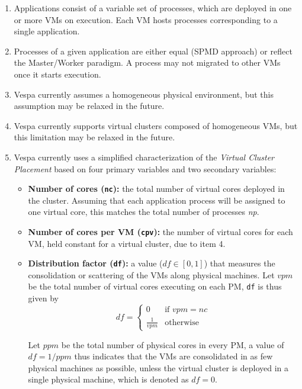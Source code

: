 \documentclass[11pt]{article}
\begin{document}
\begin{enumerate}
  \item Applications consist of a variable set of processes, which are deployed in one or more VMs on execution. Each VM hosts processes corresponding to a single application.
  \item Processes of a given application are either equal (SPMD approach) or reflect the Master/Worker paradigm. A process may not migrated to other VMs once it starts execution.%
  \item Vespa currently assumes a homogeneous physical environment, but this assumption may be relaxed in the future.
  \item Vespa currently supports virtual clusters composed of homogeneous VMs, but this limitation may be relaxed in the future.
  \item Vespa currently uses a simplified characterization of the \emph{Virtual Cluster Placement} based on four primary variables and two secondary variables:
  \begin{itemize}
    \item \textbf{Number of cores (\texttt{nc}):} the total number of virtual cores deployed in the cluster. Assuming that each application process will be assigned to one virtual core, this matches the total number of processes \textit{np}.
  \item \textbf{Number of cores per VM (\texttt{cpv}):} the number of virtual cores for each VM, held constant for a virtual cluster, due to item 4. 
  \item \textbf{Distribution factor (\texttt{df}):} a value ($df \in [0, 1]$) that measures the consolidation or scattering of the VMs along physical machines. Let $vpm$ be the total number of virtual cores executing on each PM, \texttt{df} is thus given by
\begin{equation}
\label{eq:df}
df = \left\{
  \begin{array}{ll}
    0         & \textrm{if } vpm=nc \\
    \frac{1}{vpm}   & \textrm{otherwise}
  \end{array}
  \right.
\end{equation}

  Let $ppm$ be the total number of physical cores in every PM, a value of $df=1/ppm$ thus indicates that the VMs are consolidated in as few physical machines as possible, unless the virtual cluster is deployed in a single physical machine, which is denoted as $df=0$. %


\end{itemize}
\end{enumerate}
\end{document}
